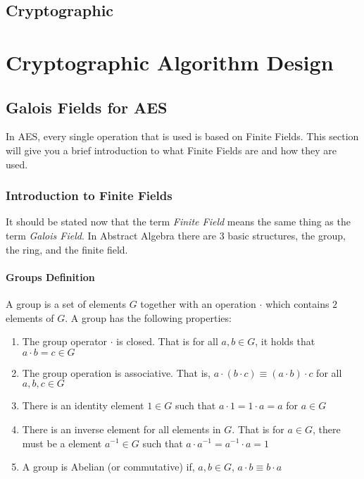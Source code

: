 \subsection{Cryptographic }


\section{Cryptographic Algorithm Design}

\subsection{Galois Fields for AES}

In AES, every single operation that is used is based on Finite Fields. This section will give you a brief introduction to what Finite Fields are and how they are used.

\subsubsection{Introduction to Finite Fields}

It should be stated now that the term \textit{Finite Field} means the same thing as the term \textit{Galois Field}. In Abstract Algebra there are 3 basic structures, the group, the ring, and the finite field.

\paragraph{Groups Definition}
A group is a set of elements $G$ together with an operation $\cdot$ which contains $2$ elements of $G$. A group has the following properties:
\begin{enumerate}
\item{The group operator $\cdot$ is closed. That is for all $a,b \in G$, it holds that $a \cdot b = c \in G$}
\item{The group operation is associative. That is, $a \cdot (b \cdot c) \equiv (a \cdot b) \cdot c$ for all $a,b,c \in G$}
\item{There is an identity element $1 \in G$ such that $a \cdot 1 = 1 \cdot a = a$ for $a \in G$}
\item{There is an inverse element for all elements in $G$. That is for $a \in G$, there must be a element $a^{-1} \in G$ such that $a \cdot a^{-1} = a^{-1} \cdot a = 1$}
\item{A group is Abelian (or commutative) if, $a,b \in G$, $a \cdot b \equiv b \cdot a$}
\end{enumerate}

